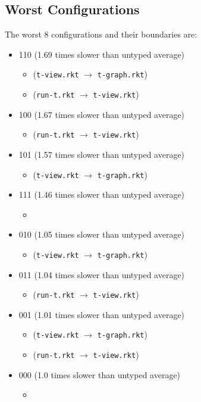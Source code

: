 \documentclass{article}
\newcommand{\mono}[1]{\texttt{#1}}
\begin{document}
\subsection{Worst Configurations}
The worst 8 configurations and their boundaries are:
\begin{itemize}
\item 110 (1.69 times slower than untyped average)
  \begin{itemize}
  \item (\mono{t-view.rkt} $\rightarrow$ \mono{t-graph.rkt})
  \item (\mono{run-t.rkt} $\rightarrow$ \mono{t-view.rkt})
  \end{itemize}
\item 100 (1.67 times slower than untyped average)
  \begin{itemize}
  \item (\mono{run-t.rkt} $\rightarrow$ \mono{t-view.rkt})
  \end{itemize}
\item 101 (1.57 times slower than untyped average)
  \begin{itemize}
  \item (\mono{t-view.rkt} $\rightarrow$ \mono{t-graph.rkt})
  \end{itemize}
\item 111 (1.46 times slower than untyped average)
  \begin{itemize}
  \item 
  \end{itemize}
\item 010 (1.05 times slower than untyped average)
  \begin{itemize}
  \item (\mono{t-view.rkt} $\rightarrow$ \mono{t-graph.rkt})
  \end{itemize}
\item 011 (1.04 times slower than untyped average)
  \begin{itemize}
  \item (\mono{run-t.rkt} $\rightarrow$ \mono{t-view.rkt})
  \end{itemize}
\item 001 (1.01 times slower than untyped average)
  \begin{itemize}
  \item (\mono{t-view.rkt} $\rightarrow$ \mono{t-graph.rkt})
  \item (\mono{run-t.rkt} $\rightarrow$ \mono{t-view.rkt})
  \end{itemize}
\item 000 (1.0 times slower than untyped average)
  \begin{itemize}
  \item 
  \end{itemize}


\end{itemize}
\end{document}
